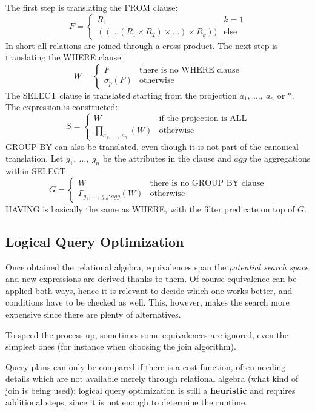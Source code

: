 The first step is translating the FROM clause:
$$F = \begin{cases}
R_1 & k = 1 \\
((\dots (R_1 \times R_2) \times \dots) \times R_k)) & \text{else}
\end{cases}$$
In short all relations are joined through a cross product. The next step is translating the WHERE clause:
$$W = \begin{cases}
F & \text{there is no WHERE clause} \\
\sigma_p(F) & \text{otherwise}
\end{cases}$$
The SELECT clause is translated starting from the projection $a_1,\ \dots,\ a_n$ or $*$. The expression is constructed:
$$S = \begin{cases}
W & \text{if the projection is ALL} \\
\prod_{a_1,\ \dots,\ a_n}(W) & \text{otherwise}
\end{cases}$$
GROUP BY can also be translated, even though it is not part of the canonical translation. Let $g_1,\ \dots,\ g_n$ be the attributes in the clause and $agg$ the aggregations within SELECT:
$$G = \begin{cases}
W & \text{there is no GROUP BY clause} \\
\Gamma_{g_1,\ \dots,\ g_m:agg}(W) & \text{otherwise}
\end{cases}$$
HAVING is basically the same as WHERE, with the filter predicate on top of $G$.

\subsection{Logical Query Optimization}
Once obtained the relational algebra, equivalences span the \textit{potential search space} and new expressions are derived thanks to them. Of course equivalence can be applied both ways, hence it is relevant to decide which one works better, and conditions have to be checked as well. This, however, makes the search more expensive since there are plenty of alternatives.

To speed the process up, sometimes some equivalences are ignored, even the simplest ones (for instance when choosing the join algorithm).

Query plans can only be compared if there is a cost function, often needing details which are not available merely through relational algebra (what kind of join is being used): logical query optimization is still a \textbf{heuristic} and requires additional steps, since it is not enough to determine the runtime.

